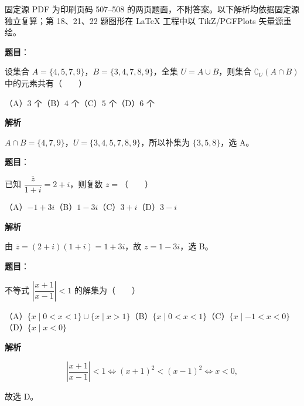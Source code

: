 

\begin{gktip}
固定源 PDF 为印刷页码 507–508 的两页题面，不附答案。以下解析均依据固定源独立复算；第 18、21、22 题图形在 LaTeX 工程中以 TikZ/PGFPlots 矢量源重绘。
\end{gktip}

\begin{answer}

\textbf{题目}：

设集合 $A=\{4,5,7,9\}$，$B=\{3,4,7,8,9\}$，全集 $U=A\cup B$，则集合 $\complement_U(A\cap B)$ 中的元素共有\mbox{（　　）}

（A）$3$ 个\quad（B）$4$ 个\quad（C）$5$ 个\quad（D）$6$ 个

\textbf{解析}

$A\cap B=\{4,7,9\}$，$U=\{3,4,5,7,8,9\}$，所以补集为
$\{3,5,8\}$，选 A。


\end{answer}
\begin{answer}

\textbf{题目}：

已知 $\dfrac{\overline z}{1+i}=2+i$，则复数 $z=$\mbox{（　　）}

（A）$-1+3i$\quad（B）$1-3i$\quad（C）$3+i$\quad（D）$3-i$

\textbf{解析}

由 $\overline z=(2+i)(1+i)=1+3i$，故 $z=1-3i$，选 B。


\end{answer}
\begin{answer}

\textbf{题目}：

不等式 $\left|\dfrac{x+1}{x-1}\right|<1$ 的解集为\mbox{（　　）}

（A）$\{x\mid0<x<1\}\cup\{x\mid x>1\}$\quad（B）$\{x\mid0<x<1\}$\quad（C）$\{x\mid-1<x<0\}$\quad（D）$\{x\mid x<0\}$

\textbf{解析}

\nopagebreak[4]
\[
\left|\frac{x+1}{x-1}\right|<1
\Longleftrightarrow (x+1)^2<(x-1)^2
\Longleftrightarrow x<0,
\]

故选 D。


\end{answer}
